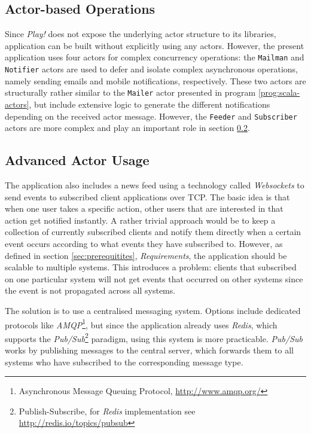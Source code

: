 \subsection{Actor-based Operations}
\label{lab:explicit-actors}
Since \textit{Play!} does not expose the underlying actor structure to its libraries, application can be built without explicitly using any actors. However, the present application uses four actors for complex concurrency operations: the \texttt{Mailman} and \texttt{Notifier} actors are used to defer and isolate complex asynchronous operations, namely sending emails and mobile notifications, respectively. These two actors are structurally rather similar to the \texttt{Mailer} actor presented in program \ref{prog:scala-actors}, but include extensive logic to generate the different notifications depending on the received actor message. However, the \texttt{Feeder} and \texttt{Subscriber} actors are more complex and play an important role in section \ref{lab:news}.

\subsection{Advanced Actor Usage}
\label{lab:news}
The application also includes a news feed using a technology called \textit{Websockets} to send events to subscribed client applications over TCP. The basic idea is that when one user takes a specific action, other users that are interested in that action get notified instantly. A rather trivial approach would be to keep a collection of currently subscribed clients and notify them directly when a certain event occurs according to what events they have subscribed to. However, as defined in section \ref{sec:prerequitites}, \textit{Requirements}, the application should be scalable to multiple systems. This introduces a problem: clients that subscribed on one particular system will not get events that occurred on other systems since the event is not propagated across all systems.

The solution is to use a centralised messaging system. Options include dedicated protocols like \textit{AMQP}\footnote{Asynchronous Message Queuing Protocol, \url{http://www.amqp.org/}}, but since the application already uses \textit{Redis}, which supports the \textit{Pub/Sub}\footnote{Publish-Subscribe, for \textit{Redis} implementation see \url{http://redis.io/topics/pubsub}} paradigm, using this system is more practicable. \textit{Pub/Sub} works by publishing messages to the central server, which forwards them to all systems who have subscribed to the corresponding message type.

